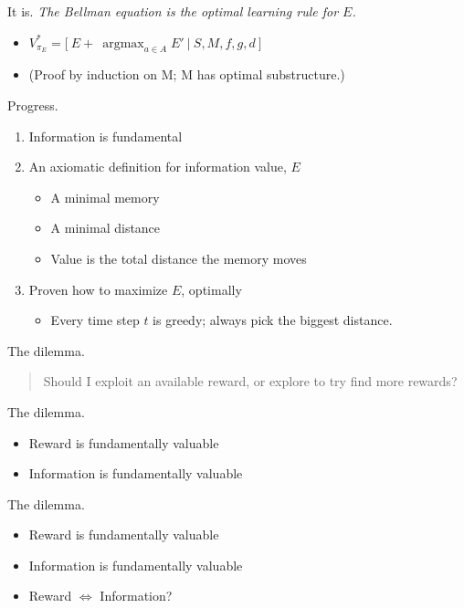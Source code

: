 \documentclass[10pt]{beamer}
\DeclareMathOperator*{\argmax}{argmax}
\begin{document}
\begin{frame}[fragile]{It is.}
\textit{The Bellman equation is the optimal learning rule for $E$.}
\begin{itemize}
\item $V^*_{\pi_{E}} = \Big [\ E + \ \argmax_{a \in A} E'\ \Big |\ S, M, f, g, d \ \Big ]$
\item (Proof by induction on M; M has optimal substructure.)
\end{itemize}
\end{frame}

\begin{frame}[fragile]{Progress.}
\begin{enumerate}
\item Information is fundamental
\item An axiomatic definition for information value, $E$
\begin{itemize}
\item A minimal memory
\item A minimal distance
\item Value is the total distance the memory moves
\end{itemize}
\item Proven how to maximize $E$, optimally
\begin{itemize}
\item Every time step $t$ is greedy; always pick the biggest distance.
\end{itemize}
\end{enumerate}
\end{frame}

\begin{frame}[fragile]{The dilemma.}
    \begin{quote}
        Should I exploit an available reward, or explore to try find more rewards? 
    \end{quote}
\end{frame}

\begin{frame}[fragile]{The dilemma.}
\begin{itemize}
    \item Reward is fundamentally valuable
    \item Information is fundamentally valuable
\end{itemize}
\end{frame}

\begin{frame}[fragile]{The dilemma.}
\begin{itemize}
    \item Reward is fundamentally valuable
    \item Information is fundamentally valuable
    \item Reward $\Leftrightarrow$ Information?
\end{itemize}
\end{frame}
\end{document}

